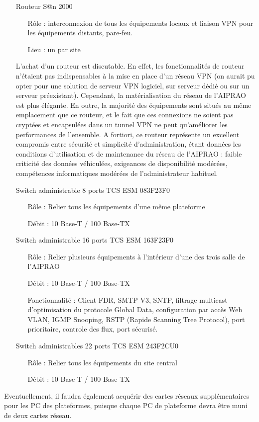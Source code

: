 \el
\begin{itemize}
\item[Routeur S@n 2000]\
\begin{itemize}
\item[Rôle]: interconnexion de tous les équipements locaux et liaison VPN pour
    les équipements distants, pare-feu.
\item[Lieu]: un par site
\end{itemize}


	L'achat d'un routeur est discutable. En effet, les fonctionnalités
de routeur n'étaient pas indispensables à la mise en place d'un réseau
VPN (on aurait pu opter pour une solution de serveur VPN logiciel, sur
serveur dédié ou sur un serveur préexistant).
	Cependant, la matérialisation du réseau de l'AIPRAO est plus élégante.
En outre, la majorité des équipements sont situés au même emplacement que
ce routeur, et le fait que ces connexions ne soient pas cryptées et encapsulées
dans un tunnel VPN ne peut qu'améliorer les performances de l'ensemble.
	A fortiori, ce routeur représente un excellent compromis entre sécurité et
simplicité d'administration, étant données les conditions d'utilisation et de
maintenance du réseau de l'AIPRAO : faible criticité des données véhiculées,
exigeances de disponibilité modérées, compétences informatiques modérées de
l'administrateur habituel.

\el
\item[Switch administrable 8 ports TCS ESM 083F23F0]\el
\begin{itemize}
\item[Rôle] : Relier tous les équipements d'une même plateforme
\item[Débit] : 10 Base-T / 100 Base-TX
\end{itemize}
\el

\item[Switch administrable 16 ports TCS ESM 163F23F0]\el
\begin{itemize}
\item[Rôle] : Relier plusieurs équipements à l'intérieur d'une des
    trois salle de l'AIPRAO
\item[Débit] : 10 Base-T / 100 Base-TX
\item[Fonctionnalité]: Client FDR, SMTP V3, SNTP, filtrage multicast d’optimisation du
protocole Global Data, configuration par accès Web VLAN, IGMP Snooping,
RSTP (Rapide Scanning Tree Protocol), port prioritaire, controle des flux,
port sécurisé.
\end{itemize}

\item[Switch administrables 22 ports TCS ESM 243F2CU0]\el
\begin{itemize}
\item[Rôle] : Relier tous les équipements du site central
\item[Débit] : 10 Base-T / 100 Base-TX
\end{itemize}

\end{itemize}
Eventuellement, il faudra également acquérir des cartes réseaux supplémentaires
pour les PC des plateformes, puisque chaque PC de plateforme devra être muni de
deux cartes réseau.



